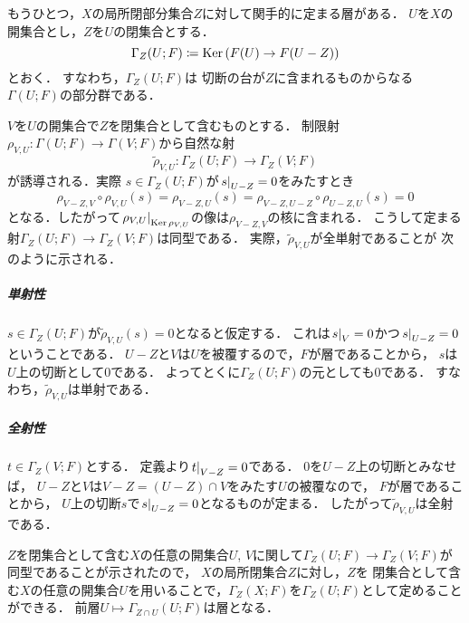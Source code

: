 もうひとつ，\(X\)の局所閉部分集合\(Z\)に対して関手的に定まる層がある．
\(U\)を\(X\)の開集合とし，\(Z\)を\(U\)の閉集合とする．
\begin{equation}
    \Gamma_Z(U;F)\coloneqq
    \Ker\left(F(U)\to F(U-Z)\right)
\end{equation}
とおく．
すなわち，\(\Gamma_Z(U;F)\)は
切断の台が\(Z\)に含まれるものからなる\(\Gamma(U;F)\)の部分群である．

\(V\)を\(U\)の開集合で\(Z\)を閉集合として含むものとする．
制限射\(
    \rho_{V,U}\colon\Gamma(U;F)\to\Gamma(V;F)
\)から自然な射\[
    \widetilde{\rho}_{V,U}\colon
    \Gamma_Z(U;F)\to\Gamma_Z(V;F)
\]が誘導される．実際
\(s\in\Gamma_Z(U;F)\)が\(\mres[s]{U-Z}=0\)をみたすとき
\[
    \rho_{V-Z,V}\circ\rho_{V,U}(s)
    =\rho_{V-Z,U}(s)
    =\rho_{V-Z,U-Z}\circ\rho_{U-Z,U}(s)
    =0
\]となる．したがって\(
    \mres[\rho_{V,U}]{\Ker\rho_{V,U}}
\)の像は\(\rho_{V-Z,V}\)の核に含まれる．
こうして定まる射\(\Gamma_Z(U;F)\to\Gamma_Z(V;F)\)は同型である．
実際，\(\widetilde{\rho}_{V,U}\)が全単射であることが
次のように示される．
\subparagraph*{単射性}
\(s\in\Gamma_Z(U;F)\)が\(
    \widetilde{\rho}_{V,U}(s)=0
\)となると仮定する．
これは\(\mres[s]{V}=0\)かつ\(\mres[s]{U-Z}=0\)ということである．
\(U-Z\)と\(V\)は\(U\)を被覆するので，\(F\)が層であることから，
\(s\)は\(U\)上の切断として\(0\)である．
よってとくに\(\Gamma_Z(U;F)\)の元としても\(0\)である．
すなわち，\(\widetilde{\rho}_{V,U}\)は単射である．
\subparagraph*{全射性}
\(t\in\Gamma_Z(V;F)\)とする．
定義より\(\mres[t]{V-Z}=0\)である．
\(0\)を\(U-Z\)上の切断とみなせば，
\(U-Z\)と\(V\)は\(V-Z=(U-Z)\cap V\)をみたす\(U\)の被覆なので，
\(F\)が層であることから，
\(U\)上の切断\(s\)で\(\mres[s]{U-Z}=0\)となるものが定まる．
したがって\(\widetilde{\rho}_{V,U}\)は全射である．

\(Z\)を閉集合として含む\(X\)の任意の開集合\(U\), \(V\)に関して\(
    \Gamma_Z(U;F)\to\Gamma_Z(V;F)
\)が同型であることが示されたので，
\(X\)の局所閉集合\(Z\)に対し，\(Z\)を
閉集合として含む\(X\)の任意の開集合\(U\)を用いることで，\(
    \Gamma_Z(X;F)
\)を\(\Gamma_Z(U;F)\)として定めることができる．
前層\(U\mapsto\Gamma_{Z\cap U}(U;F)\)は層となる．

